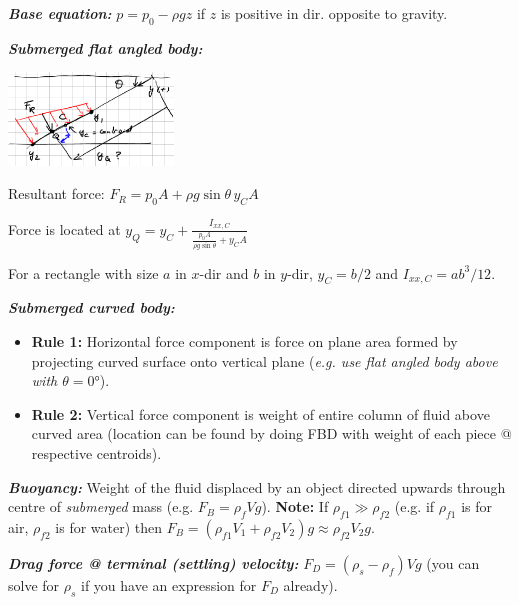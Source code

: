 \documentclass[10pt,landscape,letterpaper]{article}
\newenvironment{Figure}
    {\par\medskip\noindent\minipage{\linewidth}}
    {\endminipage\par\medskip}
\newcommand{\fsheetlabel}[1]{\textcolor{FSheetLabelColor}{\textbf{\textit{#1}}}}
\begin{document}
\begin{multicols*}{3}
\begin{minipage}{\columnwidth}
        \fsheetlabel{Base equation:} $p = p_0 - \rho g z$ if $z$ is positive in dir. opposite to gravity.
        
        \fsheetlabel{Submerged flat angled body:}
        
        \begin{Figure}
            \includegraphics[width=0.33\textwidth]{Angled_Flat_Submerged_Surface_Pressure}
            \centering
        \end{Figure}
        
        Resultant force: $F_R = p_0 A + \rho g \sin{\theta} \,y_C A$
        
        Force is located at $y_Q = y_C + \frac{I_{xx,C}}{\frac{p_0 A}{\rho g \sin{\theta}} + y_C A}$
        
        For a rectangle with size $a$ in $x$-dir and $b$ in $y$-dir, $y_C = b/2$ and $I_{xx,C} = a b^3 / 12$.
        
        \fsheetlabel{Submerged curved body:}
        
        \begin{itemize}
            \item \textbf{Rule 1:} Horizontal force component is force on plane area formed by projecting curved surface onto vertical plane (\textit{e.g. use flat angled body above with $ \theta = \ang{0} $}).
            \item \textbf{Rule 2:} Vertical force component is weight of entire column of fluid above curved area (location can be found by doing FBD with weight of each piece @ respective centroids).
        \end{itemize}
    
        \fsheetlabel{Buoyancy:} Weight of the fluid displaced by an object directed upwards through centre of \textit{submerged} mass (e.g. $ F_B = \rho_f V g $). \textbf{Note:} If $ \rho_{f1} \gg \rho_{f2} $ (e.g. if $\rho_{f1}$ is for air, $\rho_{f2}$ is for water) then $ F_B = \left(\rho_{f1}V_1 + \rho_{f2}V_2\right)g \approx \rho_{f2}V_2g$.
        
        \fsheetlabel{Drag force @ terminal (settling) velocity:} $ F_D = \left( \rho_s - \rho_f \right) V g $ (you can solve for $ \rho_s $ if you have an expression for $ F_D $ already).
    \end{minipage}
    \vspace{2ex plus .5ex minus .5ex}
    

\end{multicols*}
\end{document}
